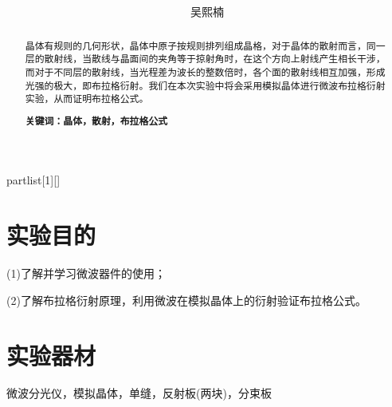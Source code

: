 \documentclass[UTF8]{ctexart}
\author{
	吴熙楠}
\title{
	\heiti{微波布拉格衍射实验报告}
}
\begin{document}
	\maketitle
	\newtheorem{definition}{定义}[subsection]
	\newtheorem{function}{公式}[subsection]
	\newtheorem{summary}{小结}[subsection]
	\newtheorem{deduction}{推论}[subsection]
	\newtheorem{property}{性质}[subsection]
	\newtheorem{theo}{定理}[subsection]
	\newtheorem{step}{步骤}[subsection]
	\newtheorem{remark}{注记}[subsection]
	\newtheorem{proof}{证明}[subsection]
	\newenvironment{Theorem}[1][]{\par\noindent\textbf{定理}(#1)\quad}{\par}
	\newcommand{\rbra}[1]{\left( #1 \right)}
	\newcommand{\sbra}[1]{\left[ #1 \right]}
	\newcommand{\cbra}[1]{\left\{ #1 \right\}}
	\newcommand{\pbra}[1]{\left< #1 \right>}
	\newcommand{\abs}[1]{\left| #1 \right|}
	\newcommand{\fs}[2]{\displaystyle\frac{#1}{#2}}
	
	\newenvironment{myproof}{{\color{blue}证：}}
	
	\newenvironment{partlist}[1][]
	{\begin{enumerate}[itemsep=0pt, label=(\arabic*), wide, labelindent=\parindent, listparindent=\parindent, #1]}
		{\end{enumerate}}
	
	\renewcommand{\contentsname}{目录} %
	\tableofcontents
	\newpage
	\renewcommand{\abstractname}{\large 摘要\\}
	\begin{abstract}
		晶体有规则的几何形状，晶体中原子按规则排列组成晶格，对于晶体的散射而言，同一层的散射线，当散线与晶面间的夹角等于掠射角时，在这个方向上射线产生相长干涉，而对于不同层的散射线，当光程差为波长的整数倍时，各个面的散射线相互加强，形成光强的极大，即布拉格衍射。我们在本次实验中将会采用模拟晶体进行微波布拉格衍射实验，从而证明布拉格公式。
		
		\textbf{关键词：晶体，散射，布拉格公式}
	\end{abstract}
	\section{实验目的}
	(1)了解并学习微波器件的使用；
	\par (2)了解布拉格衍射原理，利用微波在模拟晶体上的衍射验证布拉格公式。
	\section{实验器材}
	微波分光仪，模拟晶体，单缝，反射板(两块)，分束板
\end{document}
